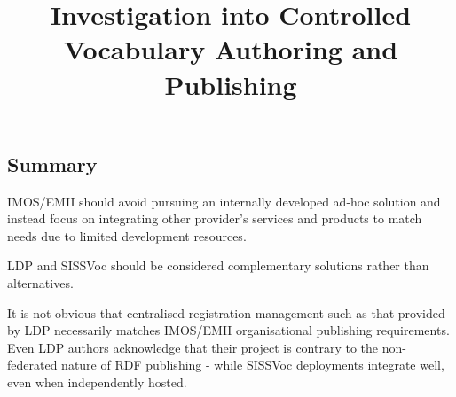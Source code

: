 \documentclass[10pt,a4paper]{article}
\title{Investigation into Controlled Vocabulary Authoring and Publishing}
\date{}
\newenvironment{italicquotes}
{\begin{quote}\itshape}
{\end{quote}}
\let\Item\item
\newcommand\SpecialItem{\renewcommand\item[1][]{\Item[\textbullet~\bfseries##1]}}
\begin{document}
\SpecialItem

  \maketitle
    \begin{flushleft}



% 
% 



\section{
	Summary
}

\item[] IMOS/EMII should avoid pursuing an internally developed ad-hoc solution and instead 
focus on integrating other provider's services and products to match needs due 
to limited development resources.
\item[] LDP and SISSVoc should be considered complementary solutions rather than alternatives.
\item[] It is not obvious that centralised registration management such as 
that provided by LDP necessarily matches IMOS/EMII organisational publishing 
requirements. Even LDP authors acknowledge that their project is contrary to the 
non-federated nature of RDF publishing - while SISSVoc deployments integrate well, 
even when independently hosted.


\end{flushleft}
\end{document}
